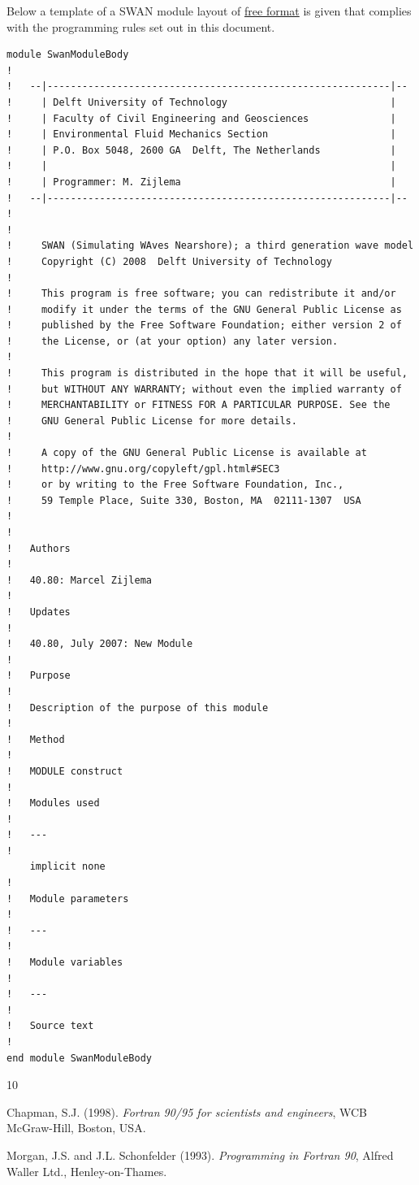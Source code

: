 \documentclass[12pt]{book}
\begin{document}
\newpage
\noindent
Below a template of a SWAN module layout of \underline{free format} is given that complies with the programming rules set out in this document.
\\[2ex]
\begin{verbatim}
module SwanModuleBody
!
!   --|-----------------------------------------------------------|--
!     | Delft University of Technology                            |
!     | Faculty of Civil Engineering and Geosciences              |
!     | Environmental Fluid Mechanics Section                     |
!     | P.O. Box 5048, 2600 GA  Delft, The Netherlands            |
!     |                                                           |
!     | Programmer: M. Zijlema                                    |
!   --|-----------------------------------------------------------|--
!
!
!     SWAN (Simulating WAves Nearshore); a third generation wave model
!     Copyright (C) 2008  Delft University of Technology
!
!     This program is free software; you can redistribute it and/or
!     modify it under the terms of the GNU General Public License as
!     published by the Free Software Foundation; either version 2 of
!     the License, or (at your option) any later version.
!
!     This program is distributed in the hope that it will be useful,
!     but WITHOUT ANY WARRANTY; without even the implied warranty of
!     MERCHANTABILITY or FITNESS FOR A PARTICULAR PURPOSE. See the
!     GNU General Public License for more details.
!
!     A copy of the GNU General Public License is available at
!     http://www.gnu.org/copyleft/gpl.html#SEC3
!     or by writing to the Free Software Foundation, Inc.,
!     59 Temple Place, Suite 330, Boston, MA  02111-1307  USA
!
!
!   Authors
!
!   40.80: Marcel Zijlema
!
!   Updates
!
!   40.80, July 2007: New Module
!
!   Purpose
!
!   Description of the purpose of this module
!
!   Method
!
!   MODULE construct
!
!   Modules used
!
!   ---
!
    implicit none
!
!   Module parameters
!
!   ---
!
!   Module variables
!
!   ---
!
!   Source text
!
end module SwanModuleBody
\end{verbatim}

\newpage
\markboth{}{}
\begin{thebibliography}{10}

Chapman, S.J. (1998). {\it Fortran 90/95 for scientists and engineers}, WCB McGraw-Hill, Boston, USA.

Morgan, J.S. and J.L. Schonfelder (1993). {\it Programming in Fortran 90}, Alfred Waller Ltd.,
Henley-on-Thames.

\end{thebibliography}
\end{document}
